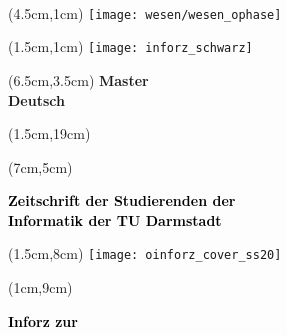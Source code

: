 \begin{titlepage}~


    \begin{textblock*}{12cm}(4.5cm,1cm)
        \texttt{[image: wesen/wesen\_ophase]}
    \end{textblock*}

    \begin{textblock*}{12cm}(1.5cm,1cm)
        \texttt{[image: inforz\_schwarz]}
    \end{textblock*}


    \begin{textblock*}{12cm}(6.5cm,3.5cm)
        \centering\fontsize{25}{25}\sffamily\textbf{
            \textcolor{mycolor}{Master } \\
            \textcolor{mycolor}{Deutsch}}
    \end{textblock*}



    \begin{textblock*}{12cm}(1.5cm,19cm)
    \end{textblock*}


    \begin{textblock*}{7cm}(7cm,5cm)
        \begin{flushright}
            \large\sffamily\textbf{
                \textcolor{black}{Zeitschrift der Studierenden der}\\
                \textcolor{black}{Informatik der TU Darmstadt}}
        \end{flushright}
    \end{textblock*}

    \begin{textblock*}{18cm}(1.5cm,8cm)
        \texttt{[image: oinforz\_cover\_ss20]}
    \end{textblock*}

    \begin{textblock*}{5cm}(1cm,9cm)
        \begin{rotate}{90}
            \sffamily\huge\textbf{
                \textcolor{black}{Inforz zur \ophase}}
        \end{rotate}
    \end{textblock*}



\end{titlepage}
